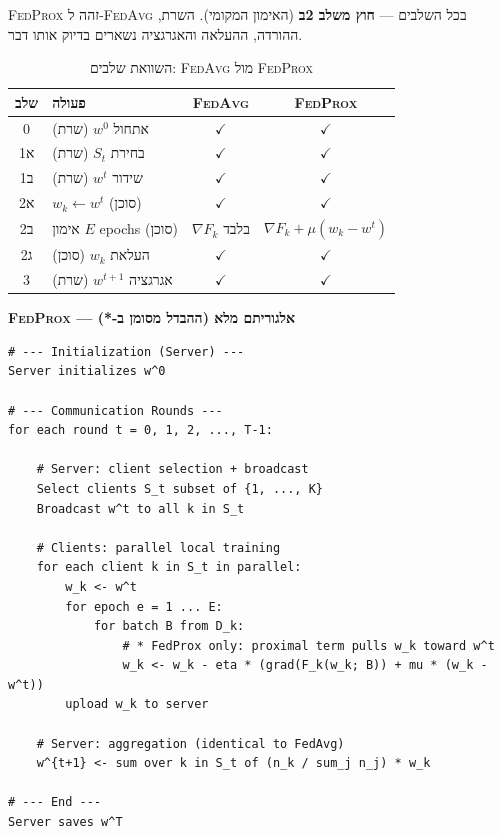 \documentclass[11pt,a4paper]{article}
\newenvironment{infobox}[2][gray]{%
  \par\smallskip
  \begin{mdframed}[
    linecolor=#1!60!black,
    linewidth=0.7pt,
    backgroundcolor=#1!6,
    roundcorner=3pt,
    innertopmargin=7pt,
    innerbottommargin=7pt,
    innerleftmargin=8pt,
    innerrightmargin=8pt,
    skipabove=6pt,
    skipbelow=6pt
  ]%
  {\color{#1!70!black}\bfseries #2}\par\smallskip
}{%
  \end{mdframed}%
  \par\smallskip
}
\newenvironment{codebox}[1]{\begin{infobox}[gray]{#1}\begin{english}\setLTR}{\end{english}\end{infobox}}
\newcommand{\FedAvg}{\textsc{FedAvg}}
\newcommand{\FedProx}{\textsc{FedProx}}
\begin{document}
\FedProx{} זהה ל-\FedAvg{} בכל השלבים --- \textbf{חוץ משלב 2ב} (האימון המקומי).
השרת, ההורדה, ההעלאה והאגרגציה נשארים בדיוק אותו דבר.

\begin{table}[H]
  \centering
  \caption{השוואת שלבים: \FedAvg{} מול \FedProx}
  \label{tab:fedavg-vs-fedprox-steps}
  \begin{tabular}{@{}c>{\raggedright\arraybackslash}p{5.5cm}cc@{}}
    \toprule
    \textbf{שלב} & \textbf{פעולה} & \FedAvg & \FedProx \\
    \midrule
    0 & אתחול $w^0$ (שרת) & $\checkmark$ & $\checkmark$ \\
    1א & בחירת $S_t$ (שרת) & $\checkmark$ & $\checkmark$ \\
    1ב & שידור $w^t$ (שרת) & $\checkmark$ & $\checkmark$ \\
    2א & $w_k \leftarrow w^t$ (סוכן) & $\checkmark$ & $\checkmark$ \\
    2ב & אימון $E$ epochs (סוכן) & $\nabla F_k$ בלבד & $\nabla F_k + \mu(w_k{-}w^t)$ \\
    2ג & העלאת $w_k$ (סוכן) & $\checkmark$ & $\checkmark$ \\
    3 & אגרגציה $w^{t+1}$ (שרת) & $\checkmark$ & $\checkmark$ \\
    \bottomrule
  \end{tabular}
\end{table}

\begin{codebox}{\FedProx{} --- אלגוריתם מלא (ההבדל מסומן ב-*)}
\begin{lstlisting}[language={}]
# --- Initialization (Server) ---
Server initializes w^0

# --- Communication Rounds ---
for each round t = 0, 1, 2, ..., T-1:

    # Server: client selection + broadcast
    Select clients S_t subset of {1, ..., K}
    Broadcast w^t to all k in S_t

    # Clients: parallel local training
    for each client k in S_t in parallel:
        w_k <- w^t
        for epoch e = 1 ... E:
            for batch B from D_k:
                # * FedProx only: proximal term pulls w_k toward w^t
                w_k <- w_k - eta * (grad(F_k(w_k; B)) + mu * (w_k - w^t))
        upload w_k to server

    # Server: aggregation (identical to FedAvg)
    w^{t+1} <- sum over k in S_t of (n_k / sum_j n_j) * w_k

# --- End ---
Server saves w^T
\end{lstlisting}
\end{codebox}
\end{document}
